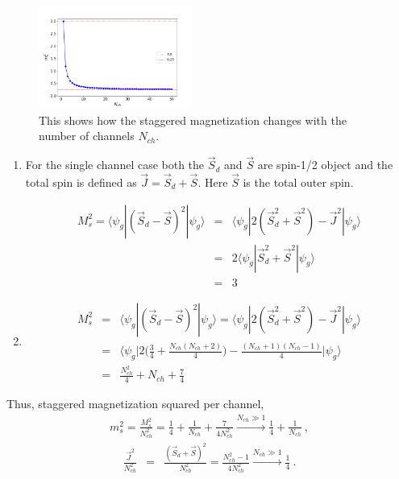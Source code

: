 \documentclass[reprint,prb,superscriptaddress]{revtex4-2}
\begin{document}
\begin{figure}
\includegraphics[width=0.45\textwidth]{plt/Staggered_mag_50.png}
\caption{This shows how the staggered magnetization changes with the number of channels $N_{ch}$.}
\label{fig:st_mag}
\end{figure}

\begin{enumerate}
\item For the single channel case both the $\vec{S}_d$ and $\vec{S}$ are spin-1/2 object and the total spin is defined as $\vec{J}=\vec{S}_d+\vec{S}$. Here $\vec{S}$ is the total outer spin.

\begin{eqnarray}
M_s^2 = \langle \psi_g | (\vec{S}_d - \vec{S})^2 |\psi_g\rangle &=& \langle \psi_g | 2(\vec{S}_d^2 + \vec{S}^2)-\vec{J}^2 |\psi_g\rangle \nonumber\\
&=& 2 \langle \psi_g | \vec{S}_d^2 +\vec{S}^2 |\psi_g\rangle \nonumber\\
&=& 3
\end{eqnarray}

\item \begin{eqnarray}
M_s^2 &=& \langle \psi_g | (\vec{S}_d - \vec{S})^2 |\psi_g\rangle = \langle \psi_g | 2(\vec{S}_d^2 + \vec{S}^2)-\vec{J}^2 |\psi_g\rangle \nonumber\\
&=&  \bigg\langle \psi_g \bigg| 2\bigg(\frac{3}{4}+ \frac{N_{ch}(N_{ch}+2)}{4}\bigg)- \frac{(N_{ch}+1)(N_{ch}-1)}{4} \bigg|\psi_g \bigg\rangle \nonumber\\
&=& \frac{N_{ch}^2}{4}+N_{ch}+\frac{7}{4}
\end{eqnarray}

\end{enumerate}

\noindent Thus, staggered magnetization squared per channel,
\begin{eqnarray}
m_s^2=\frac{M_s^2}{N_{ch}^2}=\frac{1}{4}+\frac{1}{N_{ch}}+\frac{7}{4N_{ch}^2} \xrightarrow[]{N_{ch}\gg 1} \frac{1}{4}+\frac{1}{N_{ch}}~,
\end{eqnarray}
\begin{eqnarray}
\frac{\vec{J}^2}{N_{ch}^2}&=&\frac{(\vec{S}_d+\vec{S})^2}{N_{ch}^2}= \frac{N^2_{ch}-1}{4N^2_{ch}} \xrightarrow[]{N_{ch}\gg 1} \frac{1}{4}~. \nonumber 
\end{eqnarray}
\end{document}
